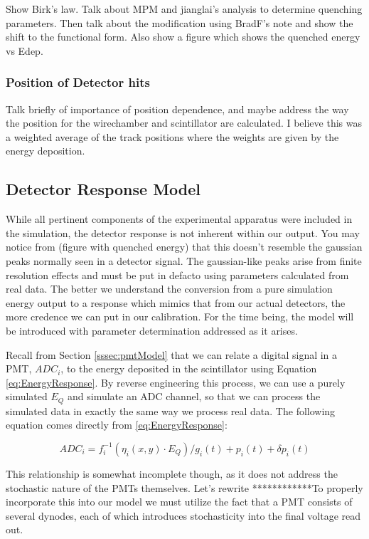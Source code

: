 Show Birk's law. Talk about MPM and jianglai's analysis to determine
quenching parameters. Then talk about the modification using BradF's note
and show the shift to the functional form. Also show a figure which shows
the quenched energy vs Edep.


\subsubsection{Position of Detector hits}
Talk briefly of importance of position dependence, and maybe address
the way the position for the wirechamber and scintillator are calculated.
I believe this was a weighted average of the track positions where the
weights are given by the energy deposition.

\subsection{Detector Response Model}
While all pertinent components of the experimental apparatus were included
in the simulation, the detector response is not inherent within our
output. You may notice from (figure with quenched energy) that this
doesn't resemble the gaussian peaks normally seen in a detector signal.
The gaussian-like peaks arise from finite resolution effects and
must be put in defacto using parameters calculated
from real data. The better we understand the conversion from a pure simulation
energy output to a response which mimics that from our actual detectors, the
more credence we can put in our calibration. For the time being, the model will
be introduced with parameter determination addressed as it arises. 

Recall from Section \ref{sssec:pmtModel} that we can relate a digital signal
in a PMT, $ADC_i$, to the energy deposited in the scintillator
using Equation \ref{eq:EnergyResponse}.
By reverse engineering this process, we can use a purely simulated $E_Q$ and
simulate an ADC channel, so that we can process the simulated data in
exactly the same way we process real data. The following equation comes directly
from \ref{eq:EnergyResponse}:

\begin{equation} \label{eq:pmtResponse}
ADC_i = f_i^{-1}\left(\eta_i(x,y) \cdot E_{Q} \right)/g_i(t) + p_i(t) + \delta p_i(t) 
\end{equation}

This relationship is somewhat incomplete though, as it does not address the
stochastic nature of the PMTs themselves. Let's rewrite ************To properly incorporate this into our
model we must utilize the fact that a PMT consists of several dynodes, each of which
introduces stochasticity into the final voltage read out. 



